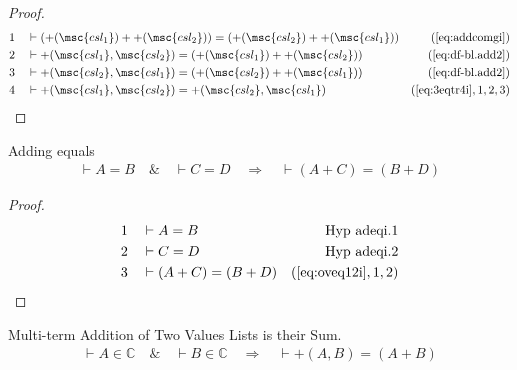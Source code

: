 \begin{proof}
\begin{align}
  1 &&  & \vdash ( +( \msc{csl_1} ) + +( \msc{csl_2} ) ) = ( +( \msc{csl_2} ) +
     +( \msc{csl_1} ) )&(\mbox{\ref{eq:addcomgi}})\notag
  \\ 2 &&  & \vdash +( \msc{csl_1} , \msc{csl_2} ) = ( +( \msc{csl_1} ) + +(
     \msc{csl_2} ) )&(\mbox{\ref{eq:df-bl.add2}})\notag
  \\ 3 &&  & \vdash +( \msc{csl_2} , \msc{csl_1} ) = ( +( \msc{csl_2} ) + +(
     \msc{csl_1} ) )&(\mbox{\ref{eq:df-bl.add2}})\notag
  \\ 4 &&  & \vdash +( \msc{csl_1} , \msc{csl_2} ) = +( \msc{csl_2} ,
     \msc{csl_1} )&(\mbox{\ref{eq:3eqtr4i}},1,2,3)\notag
\end{align}
\end{proof}

\begin{lemma} {Adding equals}
\begin{align}
\vdash A = B\quad\&\quad \vdash C = D\quad\Rightarrow\quad \vdash ( A + C ) = (
    B + D )\label{eq:bl.adeqi}\tag{bl.adeqi}
\end{align}
\end{lemma}


\begin{proof}
\begin{align}
  1 &&  & \vdash A = B&\text{Hyp~adeqi.1}\notag%
  \\ 2 &&  & \vdash C = D&\text{Hyp~adeqi.2}\notag%
  \\ 3 &&  & \vdash ( A + C ) = ( B + D )&(\mbox{\ref{eq:oveq12i}},1,2)\notag
\end{align}
\end{proof}

\begin{lemma} {Multi-term Addition of Two Values Lists is
their Sum.}
\begin{align}
\vdash A \in \mathbb{C}\quad\&\quad \vdash B \in
    \mathbb{C}\quad\Rightarrow\quad \vdash +( A , B ) = ( A + B
    )\label{eq:bl.add2i}\tag{bl.add2i}
\end{align}
\end{lemma}


